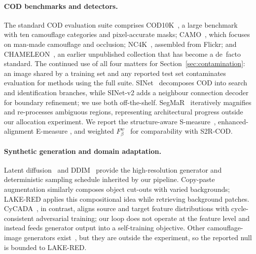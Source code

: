 \documentclass{article} %
\begin{document}
\paragraph{COD benchmarks and detectors.}
The standard COD evaluation suite comprises COD10K~\cite{fan2022concealed}, a large benchmark
with ten camouflage categories and pixel-accurate masks; CAMO~\cite{le2019anabranch}, which focuses
on man-made camouflage and occlusion; NC4K~\cite{lv2021simultaneously}, assembled from Flickr; and
CHAMELEON~\cite{skurowski2018animal}, an earlier unpublished collection that has become a de~facto
standard. The continued use of all four matters for Section~\ref{sec:contamination}: an image shared
by a training set and any reported test set contaminates evaluation for methods using the full suite.
SINet~\cite{fan2020sinet} decomposes COD into search and identification branches, while SINet-v2
\cite{fan2022concealed} adds a neighbour connection decoder for boundary refinement; we use both
off-the-shelf. SegMaR~\cite{jia2022segment} iteratively magnifies and re-processes ambiguous
regions, representing architectural progress outside our allocation experiment. We report the
structure-aware S-measure~\cite{fan2017structure}, enhanced-alignment E-measure
\cite{fan2018enhanced}, and weighted $F_\beta^w$~\cite{margolin2014evaluate} for comparability
with S2R-COD.

\paragraph{Synthetic generation and domain adaptation.}
Latent diffusion~\cite{rombach2022high} and DDIM~\cite{song2021denoising} provide the high-resolution
generator and deterministic sampling schedule inherited by our pipeline. Copy-paste augmentation
\cite{ghiasi2021simple} similarly composes object cut-outs with varied backgrounds; LAKE-RED applies
this compositional idea while retrieving background patches. CyCADA~\cite{hoffman2018cycada}, in
contrast, aligns source and target feature distributions with cycle-consistent adversarial training;
our loop does not operate at the feature level and instead feeds generator output into a
self-training objective. Other camouflage-image generators exist~\cite{chen2025realcamo}, but they
are outside the experiment, so the reported null is bounded to LAKE-RED.
\end{document}
